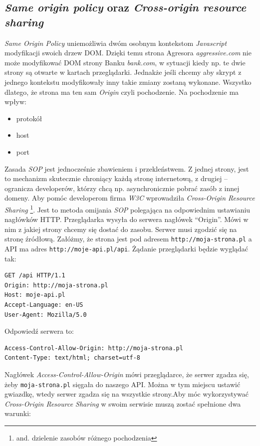 \documentclass[openright]{xmgr}
\begin{document}
\subsection{\textit{Same origin policy} oraz \textit{Cross-origin resource sharing}} 
\textit{Same Origin Policy} uniemożliwia dwóm osobnym kontekstom \textit{Javascript} modyfikacji swoich drzew DOM. Dzięki temu strona Agresora \textit{aggressive.com} nie może modyfikować DOM strony Banku \textit{ bank.com}, w sytuacji kiedy np. te dwie strony są otwarte w kartach przeglądarki. Jednakże jeśli chcemy aby skrypt z jednego kontekstu modyfikowały inny takie zmiany zostaną wykonane. Wszystko dlatego, że strona ma ten sam \textit{Origin} czyli pochodzenie. Na pochodzenie ma wpływ:
\begin{itemize}
\item protokół
\item host
\item port
\end{itemize}
Zasada \textit{SOP} jest jednocześnie zbawieniem i przekleństwem. Z jednej strony, jest to mechanizm skutecznie chroniący każdą stronę internetową, z drugiej – ogranicza developerów, którzy chcą np. asynchronicznie pobrać zasób z innej domeny. Aby pomóc developerom firma \textit{W3C} wprowadziła \textit{Cross-Origin Resource Sharing} \footnote{and. dzielenie zasobów różnego pochodzenia}. Jest to metoda omijania \textit{SOP} polegająca na odpowiednim ustawianiu nagłówków HTTP. Przeglądarka wysyła do serwera nagłówek “Origin”. Mówi w nim z jakiej strony chcemy się dostać do zasobu. Serwer musi zgodzić się na stronę źródłową. Załóżmy, że strona jest pod adresem \verb|http://moja-strona.pl| a API ma adres \verb|http://moje-api.pl/api|. Żądanie przeglądarki będzie wyglądać tak:
\begin{verbatim}
GET /api HTTP/1.1
Origin: http://moja-strona.pl
Host: moje-api.pl
Accept-Language: en-US
User-Agent: Mozilla/5.0
\end{verbatim}
Odpowiedź serwera to:
\begin{verbatim}
Access-Control-Allow-Origin: http://moja-strona.pl
Content-Type: text/html; charset=utf-8
\end{verbatim}
Nagłówek \textit{Access-Control-Allow-Origin} mówi przeglądarce, że serwer zgadza się, żeby \verb|moja-strona.pl| sięgała do naszego API. Można w tym miejscu ustawić gwiazdkę, wtedy serwer zgadza się na wszystkie strony.Aby móc wykorzystywać \textit{Cross-Origin Resource Sharing} w swoim serwisie muszą zostać spełnione dwa  warunki:
\end{document}
